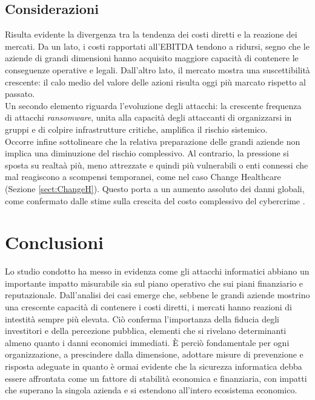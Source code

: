 \documentclass[12pt,a4paper,twoside]{report}
\begin{document}
\section{Considerazioni}

Risulta evidente la divergenza tra la tendenza dei costi diretti e la reazione dei mercati. 
Da un lato, i costi rapportati all'EBITDA tendono a ridursi, segno che le aziende di grandi dimensioni 
hanno acquisito maggiore capacit\`a di contenere le conseguenze operative e legali. Dall'altro lato, il mercato 
mostra una suscettibilit\`a crescente: il calo medio del valore delle azioni risulta oggi pi\`u marcato rispetto al passato.\\
Un secondo elemento riguarda l'evoluzione degli attacchi: la crescente frequenza di attacchi \textit{ransomware}, unita alla  
capacit\`a degli attaccanti di organizzarsi in gruppi e di colpire infrastrutture critiche, amplifica il rischio sistemico.\\ 
Occorre infine sottolineare che la relativa preparazione delle grandi aziende non implica una diminuzione del rischio 
complessivo. Al contrario, la pressione si sposta su realta\`a pi\`u, meno attrezzate e quindi pi\`u vulnerabili o enti connessi 
che mal reagiscono a scompensi temporanei, come nel caso Change Healthcare (Sezione \ref{sect:ChangeH}). 
Questo porta a un aumento assoluto dei danni globali, come confermato dalle stime sulla crescita del costo complessivo 
del cybercrime  \cite{cybercrime_magazine}.\\



\newpage



\chapter{Conclusioni}
Lo studio condotto ha messo in evidenza come gli attacchi informatici abbiano un importante impatto 
misurabile sia sul piano operativo che sui piani finanziario e reputazionale.
Dall'analisi dei casi emerge che, sebbene le grandi aziende mostrino una crescente capacit\`a
di contenere i costi diretti, i mercati hanno reazioni di intestit\`a sempre pi\`u elevata.
Ciò conferma l'importanza della fiducia degli investitori e della percezione pubblica, 
elementi che si rivelano determinanti almeno quanto i danni economici immediati.
\`E perci\`o fondamentale per ogni organizzazione, a prescindere dalla dimensione, adottare misure di 
prevenzione e risposta adeguate in quanto \`e ormai evidente che la sicurezza informatica debba essere affrontata
come un fattore di stabilit\`a economica e finanziaria, con impatti che superano 
la singola azienda e si estendono all'intero ecosistema economico.\\
\end{document}
